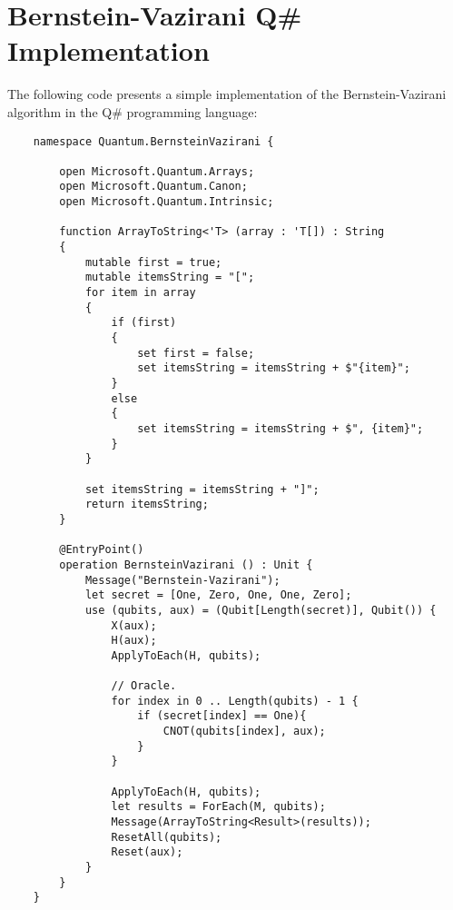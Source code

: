%
%
\chapter{Bernstein-Vazirani Q\# Implementation}
 
The following code presents a simple implementation of the Bernstein-Vazirani algorithm in the Q\# programming language:

\begin{lstlisting}
    namespace Quantum.BernsteinVazirani {

        open Microsoft.Quantum.Arrays;
        open Microsoft.Quantum.Canon;
        open Microsoft.Quantum.Intrinsic;
    
        function ArrayToString<'T> (array : 'T[]) : String
        {
            mutable first = true;
            mutable itemsString = "[";
            for item in array
            {
                if (first)
                {
                    set first = false;
                    set itemsString = itemsString + $"{item}";
                }
                else
                {
                    set itemsString = itemsString + $", {item}";
                }
            }
    
            set itemsString = itemsString + "]";
            return itemsString;
        }
    
        @EntryPoint()
        operation BernsteinVazirani () : Unit {
            Message("Bernstein-Vazirani");
            let secret = [One, Zero, One, One, Zero];
            use (qubits, aux) = (Qubit[Length(secret)], Qubit()) {
                X(aux);
                H(aux);
                ApplyToEach(H, qubits);
    
                // Oracle.
                for index in 0 .. Length(qubits) - 1 {
                    if (secret[index] == One){
                        CNOT(qubits[index], aux);
                    }
                }
    
                ApplyToEach(H, qubits);
                let results = ForEach(M, qubits);
                Message(ArrayToString<Result>(results));
                ResetAll(qubits);
                Reset(aux);
            }
        }
    }
\end{lstlisting}
